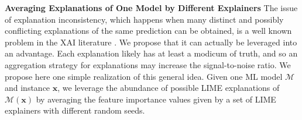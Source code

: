 \documentclass[12pt]{article}  %
\begin{document}
      \noindent\textbf{Averaging Explanations of One Model by Different Explainers}
      \label{sec:averaging_one_explainer}
      The issue of explanation inconsistency, which happens when many distinct and possibly conflicting explanations of the same prediction can be obtained, is a well known problem in the XAI literature \cite{alvarez18robustness}. 
      We propose that it can actually be leveraged into an advantage. Each explanation likely has at least a modicum of truth, and so an aggregation strategy for explanations may increase the signal-to-noise ratio. We propose here one simple realization of this general idea. Given one ML model $\mathcal{M}$ and instance $\mathbf{x}$, we leverage the abundance of possible LIME explanations of $\mathcal{M}(\mathbf{x})$ by averaging the feature importance values given by a set of LIME explainers with different random seeds. %
\end{document}
